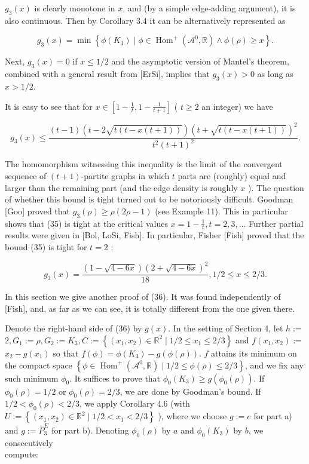 \documentclass[10pt]{article}
\begin{document}
$g_{3}(x)$ is clearly monotone in $x$, and (by a simple edge-adding argument), it is also continuous. Then by Corollary 3.4 it can be alternatively represented as

$$
g_{3}(x)=\min \left\{\phi\left(K_{3}\right) \mid \phi \in \operatorname{Hom}^{+}\left(\mathcal{A}^{0}, \mathbb{R}\right) \wedge \phi(\rho) \geq x\right\} .
$$

Next, $g_{3}(x)=0$ if $x \leq 1 / 2$ and the asymptotic version of Mantel's theorem, combined with a general result from [ErSi], implies that $g_{3}(x)>0$ as long as $x>1 / 2$.

It is easy to see that for $x \in\left[1-\frac{1}{t}, 1-\frac{1}{t+1}\right]$ ( $t \geq 2$ an integer) we have


\begin{equation*}
g_{3}(x) \leq \frac{(t-1)(t-2 \sqrt{t(t-x(t+1))})(t+\sqrt{t(t-x(t+1))})^{2}}{t^{2}(t+1)^{2}} . \tag{35}
\end{equation*}


The homomorphism witnessing this inequality is the limit of the convergent sequence of $(t+1)$-partite graphs in which $t$ parts are (roughly) equal and larger than the remaining part (and the edge density is roughly $x$ ). The question of whether this bound is tight turned out to be notoriously difficult. Goodman [Goo] proved that $g_{3}(\rho) \geq \rho(2 \rho-1)$ (see Example 11). This in particular shows that (35) is tight at the critical values $x=1-\frac{1}{t}, t=2,3, \ldots$ Further partial results were given in [Bol, LoSi, Fish]. In particular, Fisher [Fish] proved that the bound (35) is tight for $t=2$ :


\begin{equation*}
g_{3}(x)=\frac{(1-\sqrt{4-6 x})(2+\sqrt{4-6 x})^{2}}{18}, 1 / 2 \leq x \leq 2 / 3 . \tag{36}
\end{equation*}


In this section we give another proof of (36). It was found independently of [Fish], and, as far as we can see, it is totally different from the one given there.

Denote the right-hand side of (36) by $g(x)$. In the setting of Section 4, let $h:=$ $2, G_{1}:=\rho, G_{2}:=K_{3}, C:=\left\{\left(x_{1}, x_{2}\right) \in \mathbb{R}^{2} \mid 1 / 2 \leq x_{1} \leq 2 / 3\right\}$ and $f\left(x_{1}, x_{2}\right):=$ $x_{2}-g\left(x_{1}\right)$ so that $f(\phi)=\phi\left(K_{3}\right)-g(\phi(\rho))$. $f$ attains its minimum on the compact space $\left\{\phi \in \operatorname{Hom}^{+}\left(\mathcal{A}^{0}, \mathbb{R}\right) \mid 1 / 2 \leq \phi(\rho) \leq 2 / 3\right\}$, and we fix any such minimum $\phi_{0}$. It suffices to prove that $\phi_{0}\left(K_{3}\right) \geq g\left(\phi_{0}(\rho)\right)$. If $\phi_{0}(\rho)=1 / 2$ or $\phi_{0}(\rho)=2 / 3$, we are done by Goodman's bound. If $1 / 2<\phi_{0}(\rho)<2 / 3$, we apply Corollary 4.6 (with $U:=\left\{\left(x_{1}, x_{2}\right) \in \mathbb{R}^{2} \mid 1 / 2<x_{1}<2 / 3\right\}$ ), where we choose $g:=e$ for part a) and $g:=\bar{P}_{3}^{E}$ for part b). Denoting $\phi_{0}(\rho)$ by $a$ and $\phi_{0}\left(K_{3}\right)$ by $b$, we consecutively\\
compute:
\end{document}

